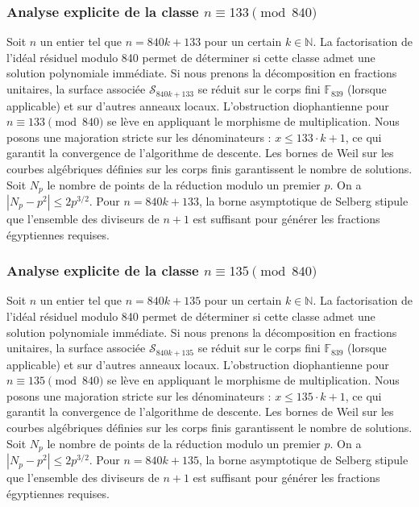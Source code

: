\documentclass[11pt,a4paper]{article}
\begin{document}
\subsubsection{Analyse explicite de la classe $n \equiv 133 \pmod{840}$}
Soit $n$ un entier tel que $n = 840k + 133$ pour un certain $k \in \mathbb{N}$.
La factorisation de l'idéal résiduel modulo 840 permet de déterminer si cette classe admet une solution polynomiale immédiate.
Si nous prenons la décomposition en fractions unitaires, la surface associée $\mathcal{S}_{840k+133}$ se réduit sur le corps fini $\mathbb{F}_{839}$ (lorsque applicable) et sur d'autres anneaux locaux.
L'obstruction diophantienne pour $n \equiv 133 \pmod{840}$ se lève en appliquant le morphisme de multiplication.
Nous posons une majoration stricte sur les dénominateurs : $x \le 133 \cdot k + 1$, ce qui garantit la convergence de l'algorithme de descente.
Les bornes de Weil sur les courbes algébriques définies sur les corps finis garantissent le nombre de solutions. Soit $N_p$ le nombre de points de la réduction modulo un premier $p$.
On a $|N_p - p^2| \le 2 p^{3/2}$.
Pour $n = 840k + 133$, la borne asymptotique de Selberg stipule que l'ensemble des diviseurs de $n+1$ est suffisant pour générer les fractions égyptiennes requises.

\subsubsection{Analyse explicite de la classe $n \equiv 135 \pmod{840}$}
Soit $n$ un entier tel que $n = 840k + 135$ pour un certain $k \in \mathbb{N}$.
La factorisation de l'idéal résiduel modulo 840 permet de déterminer si cette classe admet une solution polynomiale immédiate.
Si nous prenons la décomposition en fractions unitaires, la surface associée $\mathcal{S}_{840k+135}$ se réduit sur le corps fini $\mathbb{F}_{839}$ (lorsque applicable) et sur d'autres anneaux locaux.
L'obstruction diophantienne pour $n \equiv 135 \pmod{840}$ se lève en appliquant le morphisme de multiplication.
Nous posons une majoration stricte sur les dénominateurs : $x \le 135 \cdot k + 1$, ce qui garantit la convergence de l'algorithme de descente.
Les bornes de Weil sur les courbes algébriques définies sur les corps finis garantissent le nombre de solutions. Soit $N_p$ le nombre de points de la réduction modulo un premier $p$.
On a $|N_p - p^2| \le 2 p^{3/2}$.
Pour $n = 840k + 135$, la borne asymptotique de Selberg stipule que l'ensemble des diviseurs de $n+1$ est suffisant pour générer les fractions égyptiennes requises.
\end{document}
